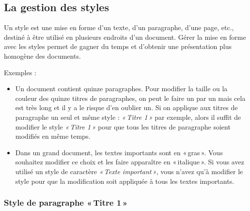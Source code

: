 \subsection{La gestion des styles}\label{Texte3styles}

Un style est une mise en forme d'un texte, d'un paragraphe, d'une page, etc., destiné à être utilisé en plusieurs endroits d'un document. Gérer la mise en forme avec les styles permet de gagner du temps et d'obtenir une présentation plus homogène des documents.

Exemples :
\begin{itemize}
\item Un document contient quinze paragraphes. Pour modifier la taille ou la couleur des quinze titres de paragraphes, on peut le faire un par un mais cela est très long et il y a le risque d'en oublier un. Si on applique aux titres de paragraphe un seul et même style : \emph{«\,Titre 1\,»} par exemple, alors il suffit de modifier le style \emph{«\,Titre 1\,»} pour que tous les titres de paragraphe soient modifiés en même temps.
\item Dans un grand document, les textes importants sont en «\,gras\,». Vous souhaitez modifier ce choix et les faire apparaître en «\,italique\,». Si vous avez utilisé un style de caractère \emph{«\,Texte important\,»}, vous n'avez qu'à modifier le style pour que la modification soit appliquée à tous les textes importants.
\end{itemize}

\subsubsection{Style de paragraphe «\,Titre 1\,»}

